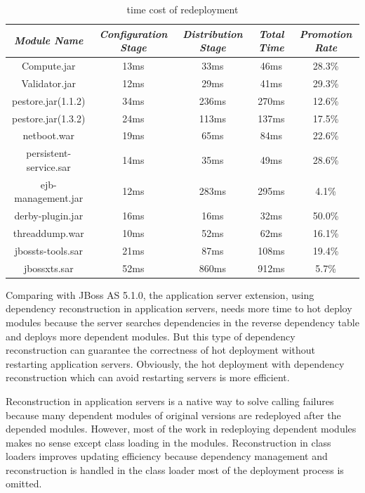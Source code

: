 \documentclass[conference]{IEEEtran}
\begin{document}
\begin{table}
\centering
\caption{time cost of redeployment}
\label{tab:stage}
\begin{tabular}{|c|c|c|c|c|}
\hline
\emph{Module Name}	&	\emph{Configuration Stage}	&	\emph{Distribution Stage}	&	\emph{Total Time}	&	\emph{Promotion Rate}\\
\hline
\hline
Compute.jar		&	13ms			&	33ms			&	46ms			&	28.3\%\\
\hline
Validator.jar		&	12ms			&	29ms			&	41ms			&	29.3\%\\
\hline
pestore.jar(1.1.2)	&	34ms			&	236ms			&	270ms			&	12.6\%\\
\hline
pestore.jar(1.3.2)	&	24ms			&	113ms			&	137ms			&	17.5\%\\
\hline
netboot.war		&	19ms		 	&	65ms			&	84ms			&	22.6\%\\
\hline
persistent-service.sar 	& 	14ms 			&	35ms			&	49ms			&	28.6\%\\
\hline
ejb-management.jar	& 	12ms		 	&	283ms			&	295ms			&	4.1\%\\
\hline
derby-plugin.jar	&	16ms			&	16ms			&	32ms			&	50.0\%\\
\hline
threaddump.war		&	10ms			&	52ms			&	62ms			&	16.1\%\\
\hline
jbossts-tools.sar	&	21ms			&	87ms			&	108ms			&	19.4\%\\
\hline
jbossxts.sar		&	52ms			&	860ms			&	912ms			&	5.7\%\\
\hline
\end{tabular}
\end{table}

Comparing with JBoss AS 5.1.0, the application server extension, using dependency reconstruction in application servers, needs more time to hot deploy modules because the server searches dependencies in the reverse dependency table and deploys more dependent modules.
But this type of dependency reconstruction can guarantee the correctness of hot deployment without restarting application servers.
Obviously, the hot deployment with dependency reconstruction which can avoid restarting servers is more efficient.

Reconstruction in application servers is a native way to solve calling failures because many dependent modules of original versions are redeployed after the depended modules.
However, most of the work in redeploying dependent modules makes no sense except class loading in the modules.
Reconstruction in class loaders improves updating efficiency because dependency management and reconstruction is handled in the class loader most of the deployment process is omitted.
\end{document}
